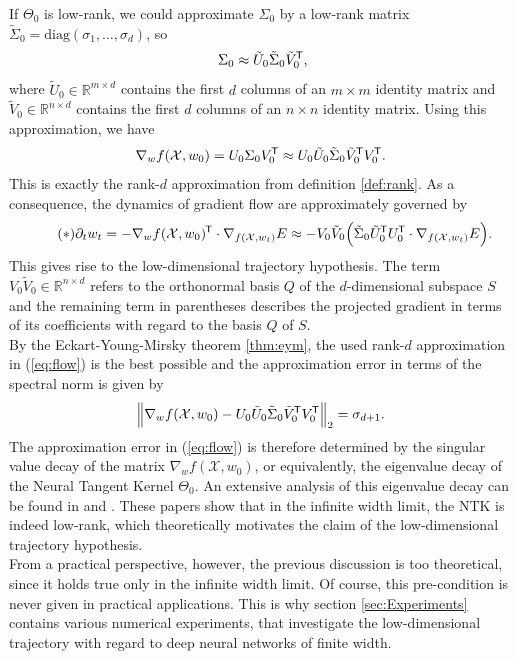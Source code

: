 \documentclass[11pt, a4paper]{article}
\newcommand{\R}{\mathbb{R}}
\newcommand{\X}{\mathcal{X}}
\newcommand*{\tr}{^{\mkern-1.5mu\mathsf{T}}}
\begin{document}
If $\Theta_0$ is low-rank, we could approximate $\Sigma_0$ by a low-rank matrix $\tilde{\Sigma}_0 = \text{diag}(\sigma_1, \dots, \sigma_d)$, so
\[ \Sigma_0 \approx \tilde{U}_0 \tilde{\Sigma}_0 \tilde{V}_0\tr , \]
where $\tilde{U}_0 \in \R^{m \times d}$ contains the first $d$ columns of an $m \times m$ identity matrix and $\tilde{V}_0 \in \R^{n \times d}$ contains the first $d$ columns of an $n \times n$ identity matrix. Using this approximation, we have
\[ \nabla_wf(\X,w_0) = U_0 \Sigma_0 V_0\tr \approx U_0 \tilde{U}_0 \tilde{\Sigma}_0 \tilde{V}_0\tr  V_0\tr . \]
This is exactly the rank-$d$ approximation from definition \ref{def:rank}. As a consequence, the dynamics of gradient flow are approximately governed by
\begin{equation} \label{eq:flow} \tag{$\ast$}
\partial_t w_t = -\nabla_wf(\X,w_0)\tr  \cdot \nabla_{f(\X,w_t)} E \approx - V_0 \tilde{V}_0 \Big ( \tilde{\Sigma}_0 \tilde{U}_0\tr  U_0\tr  \cdot \nabla_{f(\X,w_t)} E \Big ).
\end{equation}
This gives rise to the low-dimensional trajectory hypothesis. The term $V_0\tilde{V}_0 \in \R^{n \times d}$ refers to the orthonormal basis $Q$ of the $d$-dimensional subspace $S$ and the remaining term in parentheses describes the projected gradient in terms of its coefficients with regard to the basis $Q$ of $S$. \\

By the Eckart-Young-Mirsky theorem \ref{thm:eym}, the used rank-$d$ approximation in (\ref{eq:flow}) is the best possible and the approximation error in terms of the spectral norm is given by
\[ \Big \| \nabla_wf(\X,w_0) - U_0 \tilde{U}_0 \tilde{\Sigma}_0 \tilde{V}_0\tr  V_0\tr \Big \|_2 = \sigma_{d+1}. \] 
The approximation error in (\ref{eq:flow}) is therefore determined by the singular value decay of the matrix $\nabla_wf(\X,w_0)$, or equivalently, the eigenvalue decay of the Neural Tangent Kernel $\Theta_0$. An extensive analysis of this eigenvalue decay can be found in \cite{Decay1} and \cite{Decay2}. These papers show that in the infinite width limit, the NTK is indeed low-rank, which theoretically motivates the claim of the low-dimensional trajectory hypothesis. \\

From a practical perspective, however, the previous discussion is too theoretical, since it holds true only in the infinite width limit. Of course, this pre-condition is never given in practical applications. This is why section \ref{sec:Experiments} contains various numerical experiments, that investigate the low-dimensional trajectory with regard to deep neural networks of finite width.
\end{document}

